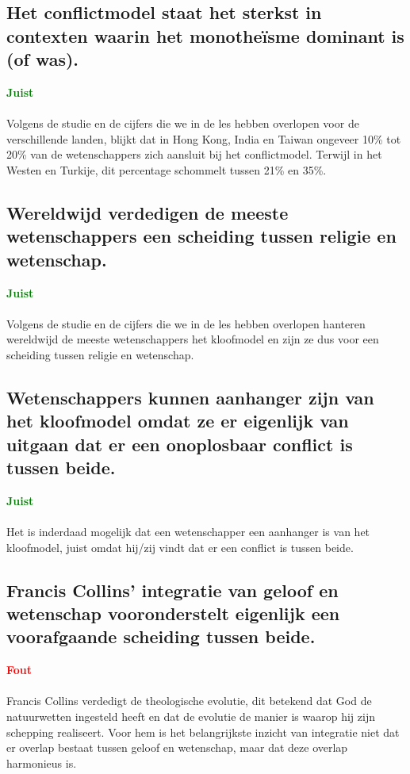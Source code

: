 \documentclass[11pt,a4paper,titlepage]{article}
\begin{document}
\subsection{Het conflictmodel staat het sterkst in contexten waarin het monotheïsme dominant is (of was).}
\textcolor{green}{\textbf{Juist}}\\\\
Volgens de studie en de cijfers die we in de les hebben overlopen voor de verschillende landen, blijkt dat in Hong Kong, India en Taiwan ongeveer 10\% tot 20\% van de wetenschappers zich aansluit bij het conflictmodel. Terwijl in het Westen en Turkije, dit percentage schommelt tussen 21\% en 35\%.

\subsection{Wereldwijd verdedigen de meeste wetenschappers een scheiding tussen religie en wetenschap.}
\textcolor{green}{\textbf{Juist}}\\\\
Volgens de studie en de cijfers die we in de les hebben overlopen hanteren wereldwijd de meeste wetenschappers het kloofmodel en zijn ze dus voor een scheiding tussen religie en wetenschap.

\subsection{Wetenschappers kunnen aanhanger zijn van het kloofmodel omdat ze er eigenlijk van uitgaan dat er een onoplosbaar conflict is tussen beide.}
\textcolor{green}{\textbf{Juist}}\\\\
Het is inderdaad mogelijk dat een wetenschapper een aanhanger is van het kloofmodel, juist omdat hij/zij vindt dat er een conflict is tussen beide.

\subsection{Francis Collins’ integratie van geloof en wetenschap vooronderstelt eigenlijk een voorafgaande scheiding tussen beide.}
\textcolor{red}{\textbf{Fout}}\\\\
Francis Collins verdedigt de theologische evolutie, dit betekend dat God de natuurwetten ingesteld heeft en dat de evolutie de manier is waarop hij zijn schepping realiseert.  Voor hem is het belangrijkste inzicht van integratie niet dat er overlap bestaat tussen geloof en wetenschap, maar dat deze overlap harmonieus is.
\end{document}
